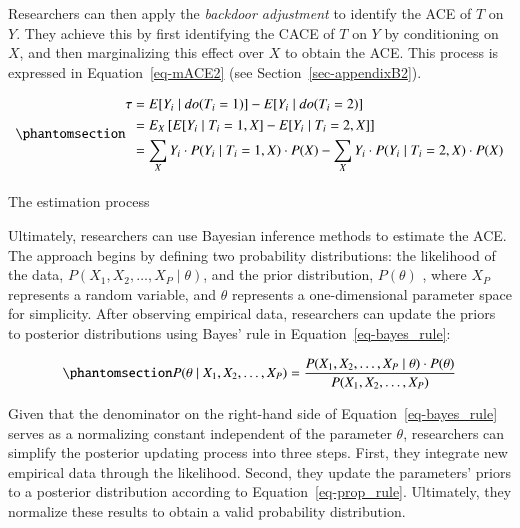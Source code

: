 \documentclass[
  authoryear,
  review,
  1p]{elsarticle}
\makeatletter
\let\oldparagraph\paragraph
\renewcommand{\paragraph}{
    \@ifstar
      \xxxParagraphStar
      \xxxParagraphNoStar
  }
\newcommand{\xxxParagraphStar}[1]{\oldparagraph*{#1}\mbox{}}
\newcommand{\xxxParagraphNoStar}[1]{\oldparagraph{#1}\mbox{}}
\makeatother
\begin{document}
Researchers can then apply the \emph{backdoor adjustment} to identify
the ACE of \(T\) on \(Y\). They achieve this by first identifying the
CACE of \(T\) on \(Y\) by conditioning on \(X\), and then marginalizing
this effect over \(X\) to obtain the ACE. This process is expressed in
Equation~\ref{eq-mACE2} (see Section~\ref{sec-appendixB2}).

\begin{equation}\phantomsection\label{eq-mACE2}{
\begin{aligned}
  \tau & = E[Y_{i} \mid do(T_{i}=1)]- E[Y_{i} \mid do(T_{i}=2)] \\
  & = E_{X}\left[ E[Y_{i} \mid T_{i}=1, X] - E[Y_{i} \mid T_{i}=2, X] \right] \\
  & = \sum_{X} Y_{i} \cdot P( Y_{i} \mid T_{i}=1, X) \cdot P(X) - \sum_{X} Y_{i} \cdot P( Y_{i} \mid T_{i}=2, X) \cdot P(X)
\end{aligned}
}\end{equation}

\paragraph{The estimation process}\label{sec-appendixB34}

Ultimately, researchers can use Bayesian inference methods to estimate
the ACE. The approach begins by defining two probability distributions:
the likelihood of the data,
\(P(X_{1}, X_{2}, \dots, X_{P} \mid \theta)\), and the prior
distribution, \(P(\theta)\) \citep{Everitt_et_al_2010}, where \(X_{P}\)
represents a random variable, and \(\theta\) represents a
one-dimensional parameter space for simplicity. After observing
empirical data, researchers can update the priors to posterior
distributions using Bayes' rule in Equation~\ref{eq-bayes_rule}:

\begin{equation}\phantomsection\label{eq-bayes_rule}{
P(\theta \mid X_{1}, X_{2}, \dots, X_{P}) = \frac{P(X_{1}, X_{2}, \dots, X_{P} \mid \theta) \cdot P(\theta)}{P(X_{1}, X_{2}, \dots, X_{P})}
}\end{equation}

Given that the denominator on the right-hand side of
Equation~\ref{eq-bayes_rule} serves as a normalizing constant
independent of the parameter \(\theta\), researchers can simplify the
posterior updating process into three steps. First, they integrate new
empirical data through the likelihood. Second, they update the
parameters' priors to a posterior distribution according to
Equation~\ref{eq-prop_rule}. Ultimately, they normalize these results to
obtain a valid probability distribution.
\end{document}
